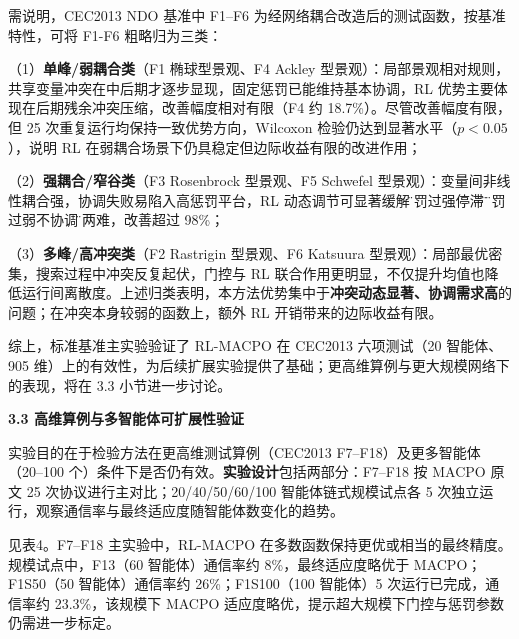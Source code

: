需说明，CEC2013 NDO 基准中 F1--F6 为经网络耦合改造后的测试函数，按基准特性，可将 F1-F6 粗略归为三类：
\par（1）\textbf{单峰/弱耦合类}（F1 椭球型景观、F4 Ackley 型景观）：局部景观相对规则，共享变量冲突在中后期才逐步显现，固定惩罚已能维持基本协调，RL 优势主要体现在后期残余冲突压缩，改善幅度相对有限（F4 约 18.7\%）。尽管改善幅度有限，但 25 次重复运行均保持一致优势方向，Wilcoxon 检验仍达到显著水平（$p{<}0.05$），说明 RL 在弱耦合场景下仍具稳定但边际收益有限的改进作用；
\par（2）\textbf{强耦合/窄谷类}（F3 Rosenbrock 型景观、F5 Schwefel 型景观）：变量间非线性耦合强，协调失败易陷入高惩罚平台，RL 动态调节可显著缓解\"惩罚过强停滞\"与\"惩罚过弱不协调\"的两难，改善超过 98\%；\par（3）\textbf{多峰/高冲突类}（F2 Rastrigin 型景观、F6 Katsuura 型景观）：局部最优密集，搜索过程中冲突反复起伏，门控与 RL 联合作用更明显，不仅提升均值也降低运行间离散度。上述归类表明，本方法优势集中于\textbf{冲突动态显著、协调需求高}的问题；在冲突本身较弱的函数上，额外 RL 开销带来的边际收益有限。

\par
\indent
综上，标准基准主实验验证了 RL-MACPO 在 CEC2013 六项测试（20 智能体、905 维）上的有效性，为后续扩展实验提供了基础；更高维算例与更大规模网络下的表现，将在 3.3 小节进一步讨论。

\par
\indent
\textbf{3.3 高维算例与多智能体可扩展性验证}
\par
\par
实验目的在于检验方法在更高维测试算例（CEC2013 F7--F18）及更多智能体（20--100 个）条件下是否仍有效。\textbf{实验设计}包括两部分：F7--F18 按 MACPO 原文 25 次协议进行主对比；20/40/50/60/100 智能体链式规模试点各 5 次独立运行，观察通信率与最终适应度随智能体数变化的趋势。

\indent
\par
见表4。F7--F18 主实验中，RL-MACPO 在多数函数保持更优或相当的最终精度。规模试点中，F13（60 智能体）通信率约 8\%，最终适应度略优于 MACPO；F1S50（50 智能体）通信率约 26\%；F1S100（100 智能体）5 次运行已完成，通信率约 23.3\%，该规模下 MACPO 适应度略优，提示超大规模下门控与惩罚参数仍需进一步标定。

